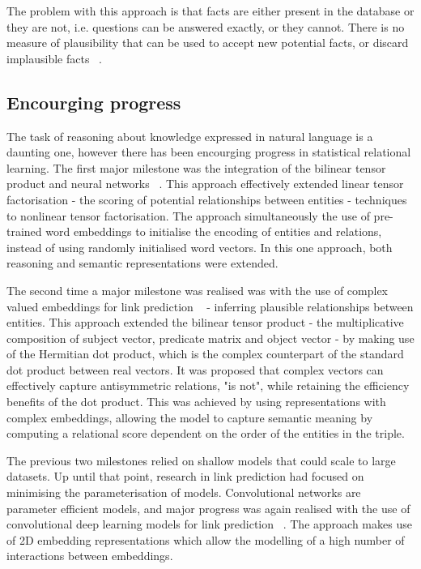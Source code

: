 \noindent The problem with this approach is that facts are either present in the database or they are not, i.e. questions can be answered exactly, or they cannot. There is no measure of plausibility that can be used to accept new potential facts, or discard implausible facts \unskip~\citep{koller2007introduction}. \par

\subsection{Encourging progress} 

The task of reasoning about knowledge expressed in natural language is a daunting one, however there has been encourging progress in statistical relational learning. The first major milestone was the integration of the bilinear tensor product and neural networks \unskip~\citep{socher2013reasoning}. This approach effectively extended linear tensor factorisation - the scoring of potential relationships between entities - techniques to nonlinear tensor factorisation. The approach simultaneously the use of pre-trained word embeddings to initialise the encoding of entities and relations, instead of using randomly initialised word vectors. In this one approach, both reasoning and semantic representations were extended. \par

\noindent The second time a major milestone was realised was with the use of complex valued embeddings for link prediction \unskip~\citep{trouillon2016complex} - inferring plausible relationships between entities. This approach extended the bilinear tensor product - the multiplicative composition of subject vector, predicate matrix and object vector - by making use of the Hermitian dot product, which is the complex counterpart of the standard dot product between real vectors. It was proposed that complex vectors can effectively capture antisymmetric relations, "is not", while retaining the efficiency benefits of the dot product. This was achieved by using representations with complex embeddings, allowing the model to capture semantic meaning by computing a relational score dependent on the order of the entities in the triple. \par
 
\noindent The previous two milestones relied on shallow models that could scale to large datasets. Up until that point, research in link prediction had focused on minimising the parameterisation of models. Convolutional networks are parameter efficient models, and major progress was again realised with the use of convolutional deep learning models for link prediction \unskip~\citep{dettmers2018convolutional}. The approach makes use of 2D embedding representations which allow the modelling of a high number of interactions between embeddings. \par

